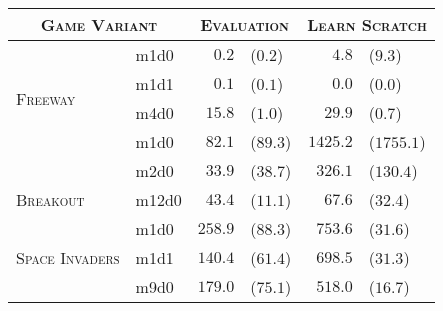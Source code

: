 \begin{tabular}{ll rl rl}
\multicolumn{2}{c}{\textsc{Game Variant}}
& \multicolumn{2}{c}{\textsc{Evaluation}}
& \multicolumn{2}{c}{\textsc{Learn Scratch}} \\ \midrule[0.4mm]
\multirow{4}{*}{\textsc{Freeway}}
& m1d0
& $0.2$ & ($0.2$)
& $4.8$ & ($9.3$) \\ \cmidrule(l){2-6}

& m1d1
& $0.1$ & ($0.1$)
& $0.0$ & ($0.0$) \\ \cmidrule(l){2-6}

& m4d0
& $15.8$ & ($1.0$)
& $29.9$ & ($0.7$) \\ \cmidrule[0.2mm]{1-6}

\multirow{3}{*}{\textsc{Hero}}
& m1d0
& $82.1$ & ($89.3$)
& $1425.2$ & ($1755.1$) \\ \cmidrule(l){2-6}

& m2d0
& $33.9$ & ($38.7$)
& $326.1$ & ($130.4$) \\ \cmidrule[0.2mm]{1-6}

\multirow{1}{*}{{\textsc{Breakout}}}

& m12d0
& $43.4$ & ($11.1$)
& $67.6$ & ($32.4$) \\ \cmidrule[0.2mm]{1-6}

\multirow{4}{*}{\textsc{Space Invaders}}

& m1d0
& $258.9$ & ($88.3$)
& $753.6$ & ($31.6$) \\ \cmidrule(l){2-6}

& m1d1
& $140.4$ & ($61.4$)
& $698.5$ & ($31.3$) \\ \cmidrule(l){2-6}

& m9d0
& $179.0$ & ($75.1$)
& $518.0$ & ($16.7$)
\end{tabular}
